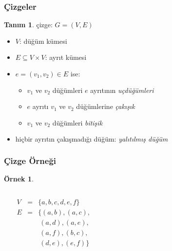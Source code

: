 \documentclass[dvipsnames]{beamer}
\theoremstyle{definition}
\newtheorem{tanim}[theorem]{Tanım}
\theoremstyle{example}
\newtheorem{ornek}[theorem]{Örnek}
\theoremstyle{plain}
\begin{document}
\begin{frame}
  \frametitle{Çizgeler}

  \begin{tanim}
    \alert{çizge}: $G=(V,E)$

    \begin{itemize}
      \item $V$: \alert{düğüm} kümesi
      \item $E \subseteq V \times V$: \alert{ayrıt} kümesi
    \end{itemize}
  \end{tanim}

  \pause
  \begin{itemize}
    \item $e=(v_1,v_2) \in E$ ise:
    \begin{itemize}
      \item $v_1$ ve $v_2$ düğümleri $e$ ayrıtının \emph{uçdüğümleri}
      \item $e$ ayrıtı $v_1$ ve $v_2$ düğümlerine \emph{çakışık}
      \item $v_1$ ve $v_2$ düğümleri \emph{bitişik}
    \end{itemize}

    \pause
    \item hiçbir ayrıtın çakışmadığı düğüm: \emph{yalıtılmış düğüm}
  \end{itemize}
\end{frame}

\begin{frame}
  \frametitle{Çizge Örneği}

  \begin{ornek}
    \begin{columns}
      \begin{center}
      \end{center}

      \pause
      $\begin{array}{lcl}
        V & = & \{a,b,c,d,e,f\}\\
        E & = & \{(a,b),(a,c),\\
          &   & ~(a,d),(a,e),\\
          &   & ~(a,f),(b,c),\\
          &   & ~(d,e),(e,f)\}
      \end{array}$
    \end{columns}
  \end{ornek}
\end{frame}
\end{document}
